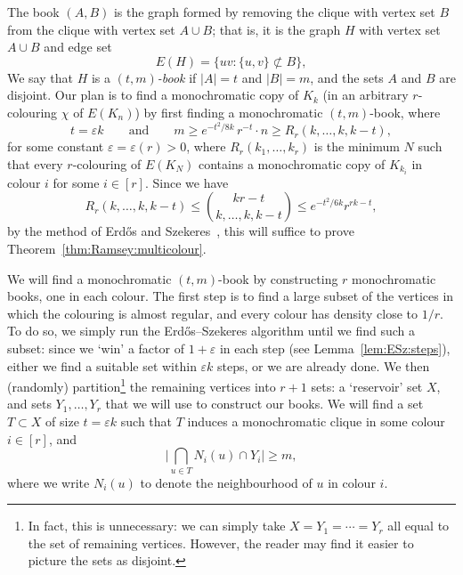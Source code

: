 \documentclass[12pt,reqno]{amsart}
\theoremstyle{definition}
\theoremstyle{remark}
\newcommand\eps{\varepsilon}
\renewcommand{\le}{\leqslant}
\renewcommand{\ge}{\geqslant}
\def\eps{\varepsilon}
\begin{document}
The book \((A,B)\) is the graph formed by removing the clique with vertex set \(B\) from the clique with vertex set \(A \cup B\); that is, it is the graph \(H\) with vertex set \(A \cup B\) and edge set
%
\begin{equation*}
	E(H) = \big\{ uv : \{u,v\} \not\subset B \big\},
\end{equation*}
%
We say that \(H\) is a \emph{\((t,m)\)-book} if \(|A| = t\) and \(|B|= m\), and the sets \(A\) and \(B\) are disjoint. Our plan is to find a monochromatic copy of \(K_k\) (in an arbitrary \(r\)-colouring \(\chi\) of \(E(K_n)\)) by first finding a monochromatic \((t,m)\)-book, where
%
\begin{equation*}
	t = \eps k \qquad \text{and} \qquad m \ge e^{-t^2/8k} \, r^{-t} \cdot n \ge R_r(k,\ldots,k,k-t),
\end{equation*}
%
for some constant \(\eps = \eps(r) > 0\), where \(R_r(k_1,\ldots,k_r)\) is the minimum \(N\) such that every \(r\)-colouring of \(E(K_N)\) contains a monochromatic copy of \(K_{k_i}\) in colour \(i\) for some \(i \in [r]\). Since we have
%
\begin{equation*}
	R_r(k,\ldots,k,k-t) \le {kr - t \choose k,\ldots,k,k-t} \le e^{-t^2/6k} r^{rk-t},
\end{equation*}
%
by the method of Erd\H{o}s and Szekeres~\cite{ESz35}, this will suffice to prove Theorem~\ref{thm:Ramsey:multicolour}.

We will find a monochromatic \((t,m)\)-book by constructing \(r\) monochromatic books, one in each colour. The first step is to find a large subset of the vertices in which the colouring is almost regular, and every colour has density close to \(1/r\). To do so, we simply run the Erd\H{o}s--Szekeres algorithm until we find such a subset: since we `win' a factor of \(1 + \eps\) in each step (see Lemma~\ref{lem:ESz:steps}), either we find a suitable set within \(\eps k\) steps, or we are already done. We then (randomly) partition\footnote{In fact, this is unnecessary: we can simply take \(X = Y_1 = \cdots = Y_r\) all equal to the set of remaining vertices. However, the reader may find it easier to picture the sets as disjoint.} the remaining vertices into \(r+1\) sets: a `reservoir' set \(X\), and sets \(Y_1,\ldots,Y_r\) that we will use to construct our books. We will find a set \(T \subset X\) of size \(t = \eps k\) such that \(T\) induces a monochromatic clique in some colour \(i \in [r]\), and
%
\begin{equation*}
	\bigg| \bigcap_{u \in T} N_i(u) \cap Y_i \bigg| \ge m,
\end{equation*}
%
where we write \(N_i(u)\) to denote the neighbourhood of \(u\) in colour \(i\).
\end{document}
